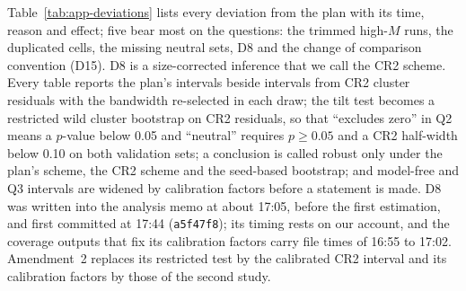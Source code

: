 Table~\ref{tab:app-deviations} lists every deviation from the plan with its time, reason and effect; five bear most on the
questions: the trimmed high-$M$ runs, the duplicated cells, the missing neutral sets, D8 and the change of comparison
convention (D15). D8 is a size-corrected
inference that we call the CR2 scheme. Every table reports the plan's intervals beside intervals from CR2 cluster
residuals with the bandwidth re-selected in each draw; the tilt test becomes a restricted wild cluster bootstrap on CR2
residuals, so that ``excludes zero'' in Q2 means a $p$-value below 0.05 and ``neutral'' requires $p\ge0.05$ and a CR2
half-width below 0.10 on both validation sets; a conclusion is called robust only under the plan's scheme, the CR2
scheme and the seed-based bootstrap; and model-free and Q3 intervals are widened by calibration factors before a
statement is made. D8 was written into the analysis memo at about 17:05, before the first estimation, and first committed
at 17:44 (\texttt{a5f47f8}); its timing rests on our account, and the coverage outputs that fix its calibration factors
carry file times of 16:55 to 17:02. Amendment~2 replaces its restricted test by the calibrated CR2 interval and its
calibration factors by those of the second study.


